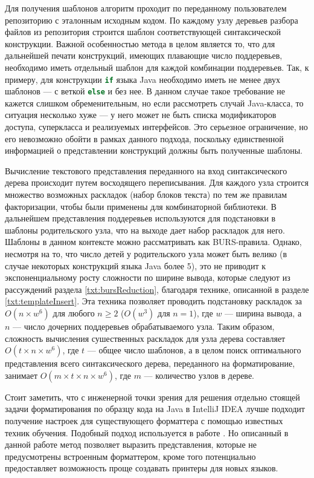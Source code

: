 Для получения шаблонов алгоритм проходит по переданному пользователем репозиторию с
эталонным исходным кодом. По каждому узлу деревьев разбора файлов из репозитория
строится шаблон соответствующей синтаксической конструкции. Важной особенностью
метода в целом
является то, что для дальнейшей печати конструкций, имеющих плавающие число
поддеревьев, необходимо иметь отдельный шаблон для каждой комбинации поддеревьев.
Так, к примеру, для конструкции \lstinline[language = Java]{if} языка Java
необходимо иметь не менее двух шаблонов --- с веткой \lstinline[language = Java]{else}
и без нее. В данном случае такое требование не кажется слишком обременительным, но
если рассмотреть случай Java-класса, то ситуация несколько хуже --- у него может не
быть списка модификаторов доступа, суперкласса и реализуемых интерфейсов.
Это серьезное ограничение, но его невозможно обойти в рамках данного подхода,
поскольку единственной информацией о представлении конструкций должны быть
полученные шаблоны.

Вычисление текстового представления переданного на вход синтаксического
дерева происходит путем восходящего переписывания. Для каждого узла строится множество
возможных раскладок (набор блоков текста) по тем же правилам факторизации, чтобы были
применены для комбинаторной библиотеки. В дальнейшем представления поддеревьев
используются для подстановки в шаблоны родительского узла, что на выходе дает
набор раскладок для него. Шаблоны в данном контексте можно рассматривать как
BURS-правила.
Однако, несмотря на то, что число детей у родительского узла может
быть велико (в случае некоторых конструкций языка Java более 5),
это не приводит к экспоненциальному росту сложности по ширине вывода, которые
следуют из рассуждений раздела \ref{txt:bursReduction}, благодаря технике, описанной
в разделе \ref{txt:templateInsert}. Эта техника позволяет проводить подстановку
раскладок за 
$O(n \times w^{6})$ для любого $n \geq 2$ ($O(w^{3})$ для $n = 1$), где
$w$ --- ширина вывода, а $n$ --- число дочерних поддеревьев обрабатываемого узла.
Таким образом, сложность вычисления сушественных раскладок для узла дерева
составляет $O(t \times n \times w^{6})$, где $t$ --- общее число шаблонов,
а в целом поиск оптимального представления всего синтаксического дерева, переданного
на форматирование, занимает $O(m \times t \times n \times w^{6})$, где $m$
--- количество узлов в дереве.


Стоит заметить, что с инженерной точки зрения для решения отдельно стоящей задачи
форматирования по образцу кода на Java в IntelliJ IDEA лучше подходит
получение настроек для существующего форматтера с помощью известных техник обучения.
Подобный подход используется в работе \cite{learning}.
Но описанный в данной работе метод позволяет выразить представления, которые не
предусмотрены встроенным форматтером, кроме того потенциально предоставляет
возможность проще создавать принтеры для новых языков. 

